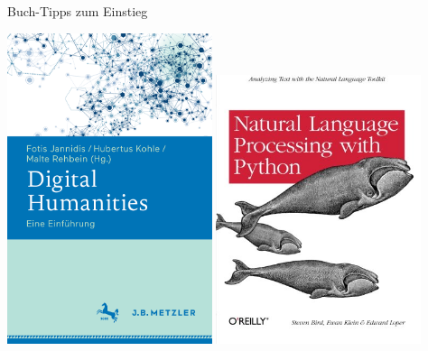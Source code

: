 \begin{frame}{Buch-Tipps zum Einstieg}

\href{https://www.springer.com/de/book/9783476026224}{\includegraphics[width=0.45\textwidth]{img/dh-einf.png}}
\hspace{2em}
\href{https://www.nltk.org/book/}{
\includegraphics[width=0.45\textwidth]{img/nltk-buch-python.jpg}
}
\end{frame}


